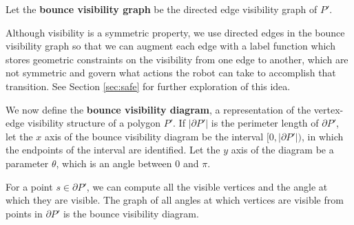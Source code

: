 \documentclass[]{styles/svproc}  %
\begin{document}
\begin{definition}
Let the \textbf{bounce visibility graph} be the directed edge visibility graph of
$P'$.
\end{definition}

Although visibility is a symmetric property, we use directed edges in the
bounce visibility graph so that 
we can augment each edge with a label function which stores
geometric constraints on the visibility from one edge to another, which are
not symmetric and govern what actions the robot can take to accomplish that
transition. See Section \ref{sec:safe} for further exploration of this idea.

We now define the \textbf{bounce visibility diagram}, a
representation of the vertex-edge visibility structure of a polygon $P'$.
If $|\partial P'|$ is the perimeter length of $\partial P'$, let the $x$ axis of the
bounce visibility diagram be the interval $[0, |\partial P'|)$, in which the
endpoints of the interval are identified. Let the $y$ axis of the diagram be a
parameter $\theta$, which is an angle between $0$ and $\pi$.

For a point $s \in \partial P'$, we can compute all the visible vertices and
the angle at which they are visible. The graph of all angles at which vertices
are visible from points in $\partial P'$ is the bounce visibility diagram.
\end{document}

